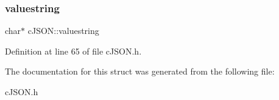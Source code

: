 \subsubsection{\texorpdfstring{valuestring}{valuestring}}
{\footnotesize\ttfamily char$\ast$ c\+J\+S\+O\+N\+::valuestring}



Definition at line 65 of file c\+J\+S\+O\+N.\+h.



The documentation for this struct was generated from the following file\+:\begin{DoxyCompactItemize}
\item 
c\+J\+S\+O\+N.\+h\end{DoxyCompactItemize}
